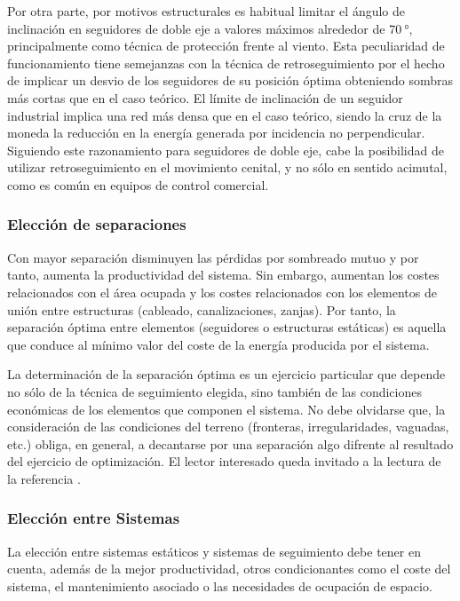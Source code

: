 Por otra parte, por motivos estructurales es habitual limitar 
el ángulo de inclinación en seguidores 
de doble eje a valores máximos alrededor de $\SI{70}{\degree}$, principalmente como
técnica de protección frente al viento. Esta peculiaridad de funcionamiento
tiene semejanzas con la técnica de retroseguimiento por el hecho de
implicar un desvio de los seguidores de su posición óptima obteniendo
sombras más cortas que en el caso teórico.  El límite de inclinación 
de un seguidor industrial implica una red más densa
que en el caso teórico, siendo la cruz de la moneda la reducción en
la energía generada por incidencia no perpendicular. 
Siguiendo este razonamiento para seguidores de doble eje, cabe la posibilidad de
utilizar retroseguimiento en el movimiento cenital, y no sólo en
sentido acimutal, como es común en equipos de control comercial.

\subsubsection{Elección de separaciones}
\label{sec:EleccionSeparaciones}

Con mayor separación disminuyen las pérdidas por sombreado
mutuo y por tanto, aumenta la productividad del sistema. Sin embargo, aumentan los costes relacionados con
el área ocupada y los costes relacionados con los elementos de unión
entre estructuras (cableado, canalizaciones, zanjas). 
Por tanto, la separación óptima entre elementos (seguidores o estructuras
estáticas) es aquella que conduce al mínimo valor del coste
de la energía producida por el sistema. 

La determinación de la separación óptima es un ejercicio
particular que depende no sólo de la técnica de
seguimiento elegida, sino también de las condiciones económicas de los
elementos que componen el sistema. No debe olvidarse que, la
consideración de las condiciones del terreno (fronteras, irregularidades, vaguadas,
etc.) obliga, en general, a decantarse por una separación algo difrente al
resultado del ejercicio de optimización.  El lector interesado queda
invitado a la lectura de la referencia \citep{Perpinan2012}.


\subsubsection{Elección entre Sistemas}
\label{sec:eleccion-sistemas}

La elección entre sistemas estáticos y sistemas de seguimiento debe
tener en cuenta, además de la mejor productividad, otros
condicionantes como el coste del sistema, el mantenimiento asociado o
las necesidades de ocupación de espacio. 

